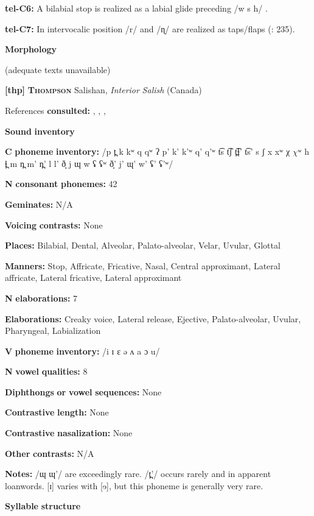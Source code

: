 \textbf{tel-C6:} A bilabial stop is realized as a labial glide preceding /w s h/ \citep[207]{Krishnamurti1998}.

\textbf{tel-C7:} In intervocalic position /r/ and /ɳ/ are realized as taps/flaps (\citealt{BhaskararaoRay2017}: 235).

\textbf{Morphology}

(adequate texts unavailable)

\textbf{[thp]}   \textbf{\textsc{Thompson}}  Salishan, \textit{Interior} \textit{Salish} (Canada)

References \textbf{consulted:} \citet{Koch2008}, \citet{ThompsonThompson1992}, \citet{ThompsonThompson1996}, \citet{ThompsonEtAl1996}

\textbf{Sound} \textbf{inventory}

\textbf{C} \textbf{phoneme} \textbf{inventory:} /p t̪ k kʷ q qʷ ʔ p’ k’ k’ʷ q’ q’ʷ t͡s t͡ʃ t̪͡ɬ’ t͡s’ s ʃ x xʷ χ $\chi ʷ$ h ɬ̪ m n̪ m’ n̪’ l l’ ð̞ j ɰ w ʢ ʢʷ ð̞’ j’ ɰ’ w’ ʢ’ ʢ’ʷ/

\textbf{N} \textbf{consonant} \textbf{phonemes:} 42

\textbf{Geminates:} N/A

\textbf{Voicing} \textbf{contrasts:} None

\textbf{Places:} Bilabial, Dental, Alveolar, Palato-alveolar, Velar, Uvular, Glottal 

\textbf{Manners:} Stop, Affricate, Fricative, Nasal, Central approximant, Lateral affricate, Lateral fricative, Lateral approximant

\textbf{N} \textbf{elaborations:} 7

\textbf{Elaborations:} Creaky voice, Lateral release, Ejective, Palato-alveolar, Uvular, Pharyngeal, Labialization

\textbf{V} \textbf{phoneme} \textbf{inventory:} /i ɪ ɛ ə ʌ a ɔ u/

\textbf{N} \textbf{vowel} \textbf{qualities:} 8

\textbf{Diphthongs} \textbf{or} \textbf{vowel} \textbf{sequences:} None

\textbf{Contrastive} \textbf{length:} None

\textbf{Contrastive} \textbf{nasalization:} None

\textbf{Other} \textbf{contrasts:} N/A

\textbf{Notes:} /ɰ ɰ’/ are exceedingly rare. /t̪’/ occurs rarely and in apparent loanwords. [ɪ] varies with [ɘ], but this phoneme is generally very rare.

\textbf{Syllable} \textbf{structure}


